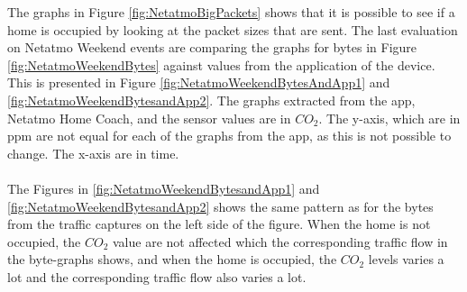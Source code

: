 The graphs in Figure \ref{fig:NetatmoBigPackets} shows that it is possible to see if a home is occupied by looking at the packet sizes that are sent. The last evaluation on Netatmo Weekend events are comparing the graphs for bytes in Figure \ref{fig:NetatmoWeekendBytes} against values from the application of the device. This is presented in Figure \ref{fig:NetatmoWeekendBytesAndApp1} and \ref{fig:NetatmoWeekendBytesandApp2}. The graphs extracted from the app, Netatmo Home Coach, and the sensor values are in \(CO_2\). The y-axis, which are in ppm are not equal for each of the graphs from the app, as this is not possible to change. The x-axis are in time. 
\\\\
The Figures in \ref{fig:NetatmoWeekendBytesandApp1} and \ref{fig:NetatmoWeekendBytesandApp2} shows the same pattern as for the bytes from the traffic captures on the left side of the figure. When the home is not occupied, the \(CO_2\) value are not affected which the corresponding traffic flow in the byte-graphs shows, and when the home is occupied, the \(CO_2\) levels varies a lot and the corresponding traffic flow also varies a lot. 

